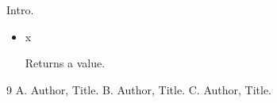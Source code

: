 \documentclass{article}
\begin{document}
Intro.
\begin{itemize}
\item x
\begin{itemize}
\description Returns a value.
\end{itemize}
\end{itemize}
\begin{thebibliography}{9}
 A. Author, Title.
 B. Author, Title.
 C. Author, Title.
\end{thebibliography}
\end{document}
